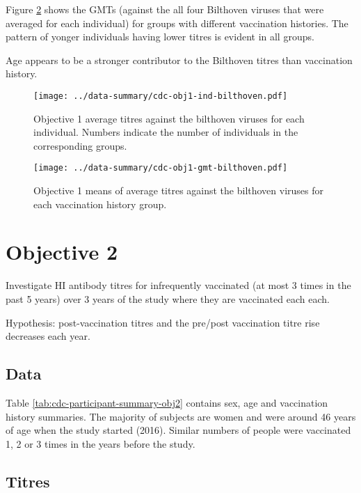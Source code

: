 \documentclass[12pt]{article}
\begin{document}
Figure \ref{fig:cdc-obj1-gmt-bilthoven} shows the GMTs (against the all four Bilthoven viruses that were averaged for each individual) for groups with different vaccination histories. The pattern of yonger individuals having lower titres is evident in all groups.

Age appears to be a stronger contributor to the Bilthoven titres than vaccination history.

\begin{figure}
	\texttt{[image: ../data-summary/cdc-obj1-ind-bilthoven.pdf]}
	\caption{Objective 1 average titres against the bilthoven viruses for each individual. Numbers indicate the number of individuals in the corresponding groups.}
	\label{fig:cdc-obj1-ind-bilthoven}
\end{figure}

\begin{figure}
	\texttt{[image: ../data-summary/cdc-obj1-gmt-bilthoven.pdf]}
	\caption{Objective 1 means of average titres against the bilthoven viruses for each vaccination history group. }
	\label{fig:cdc-obj1-gmt-bilthoven}
\end{figure}

\section{Objective 2}

Investigate HI antibody titres for infrequently vaccinated (at most 3 times in the past 5 years) over 3 years of the study where
they are vaccinated each each.

Hypothesis: post-vaccination titres and the pre/post vaccination titre rise
decreases each year.

\subsection{Data}

Table \ref{tab:cdc-participant-summary-obj2} contains sex, age and
vaccination history summaries.
The majority of subjects are
women and were around 46 years of age when the study started (2016).
Similar numbers of people were vaccinated 1, 2 or 3 times in the years before
the study.



\subsection{Titres}
\end{document}
